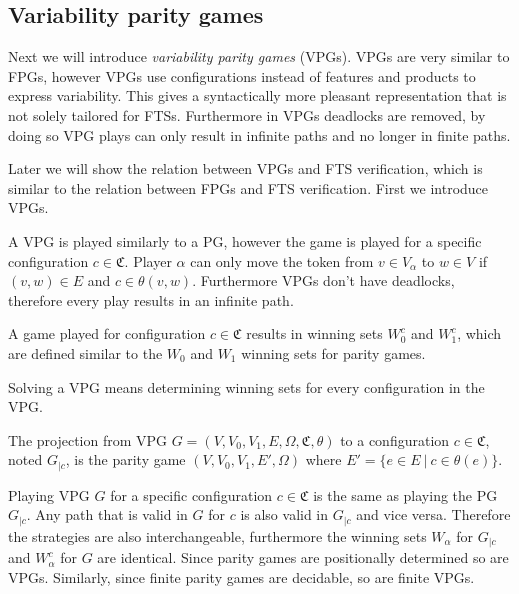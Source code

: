 \subsection{Variability parity games}
Next we will introduce \textit{variability parity games} (VPGs). VPGs are very similar to FPGs, however VPGs use configurations instead of features and products to express variability. This gives a syntactically more pleasant representation that is not solely tailored for FTSs. Furthermore in VPGs deadlocks are removed, by doing so VPG plays can only result in infinite paths and no longer in finite paths.

Later we will show the relation between VPGs and FTS verification, which is similar to the relation between FPGs and FTS verification. First we introduce VPGs.

A VPG is played similarly to a PG, however the game is played for a specific configuration $c \in \mathfrak{C}$. Player $\alpha$ can only move the token from $v \in V_\alpha$ to $w \in V$ if $(v,w) \in E$ and $c \in \theta(v,w)$. Furthermore VPGs don't have deadlocks, therefore every play results in an infinite path.

A game played for configuration $c \in \mathfrak{C}$ results in winning sets $W_0^c$ and $W_1^c$, which are defined similar to the $W_0$ and $W_1$ winning sets for parity games.

Solving a VPG means determining winning sets for every configuration in the VPG.
\begin{definition}
	\label{def_VPG_proj} The projection from VPG $G = (V, V_0, V_1, E, \Omega, \mathfrak{C}, \theta)$ to a configuration $c \in \mathfrak{C}$, noted $G_{|c}$, is the parity game $(V, V_0, V_1, E', \Omega)$ where $E' = \{ e\in E\ |\ c \in \theta(e)\}$.
\end{definition}

Playing VPG $G$ for a specific configuration $c \in \mathfrak{C}$ is the same as playing the PG $G_{|c}$. Any path that is valid in $G$ for $c$ is also valid in $G_{|c}$ and vice versa. Therefore the strategies are also interchangeable, furthermore the winning sets $W_\alpha$ for $G_{|c}$ and $W_\alpha^c$ for $G$ are identical. Since parity games are positionally determined so are VPGs. Similarly, since finite parity games are decidable, so are finite VPGs.
